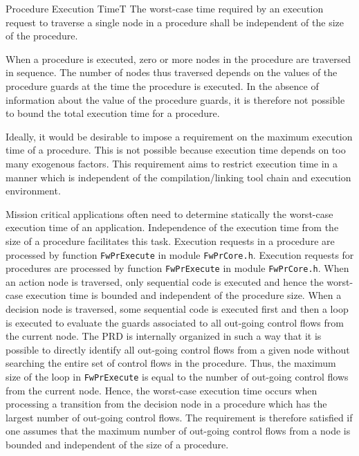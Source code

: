 \documentclass[a4paper,10pt]{article}
\newenvironment{fw_req_note}[7]
{\addtocounter{subsubsection}{1}
	\hspace{0.2cm}\textbf{FW-\arabic{section}.\arabic{subsection}.\arabic{subsubsection}/#2
	\hspace{0.8cm} #1}
	\vspace{-10pt}
\begin{longtable}{p{2.7cm}P{8.5cm}}
\hline
\textsc{Requirement} & #3 \\
\textsc{Note} & #4 \\
\textsc{Justification} & #5 \\
\textsc{Implementation} & #6  \\ 
\textsc{Verification} & #7  \\
\hline
}
{\end{longtable}}
\begin{document}
\begin{fw_req_note}{Procedure Execution Time}{T}
{The worst-case time required by an execution request
to traverse a single node in a procedure shall be independent of the size of the 
procedure.}
{When a procedure is executed, zero or more nodes in the procedure
are traversed in sequence. The number of nodes thus traversed depends on the
values of the procedure guards at the time the procedure is executed.
In the absence of information about the value of the procedure guards, it is 
therefore not possible to bound the total execution time for a procedure.

Ideally, it would be desirable to impose a requirement on the 
maximum execution time of a procedure.
This is not possible because execution time depends on too many exogenous factors. 
This requirement aims to restrict execution time in a manner which is 
independent of the compilation/linking tool chain and execution environment.}
{Mission critical applications often need to determine 
statically the worst-case execution time of an application. 
Independence of the execution time from the size of a procedure facilitates this task.}
{Execution requests in a procedure are processed by function 
\texttt{FwPrExecute} in module \texttt{FwPrCore.h}.}
{Execution requests for procedures are processed by function 
\texttt{FwPrExecute} in module \texttt{FwPrCore.h}. 
When an action node is traversed, only sequential code is executed and hence the
worst-case execution time is bounded and independent of the procedure size.
When a decision node is traversed, some sequential code is executed first and 
then a loop is executed to evaluate the guards associated to all out-going control flows
from the current node. 
The PRD is internally organized in such a way that it is possible to directly identify 
all out-going control flows from a given node without searching the entire set of control flows 
in the procedure. 
Thus, the maximum size of the loop in \texttt{FwPrExecute} 
is equal to the number of out-going control flows from the current node. 
Hence, the worst-case execution time occurs when processing a transition from the decision
node in a procedure which has the largest number of out-going control flows. 
The requirement is therefore satisfied 
if one assumes that the maximum number of out-going control flows from a node is bounded 
and independent of the size of a procedure.}
\end{fw_req_note}
\end{document}
